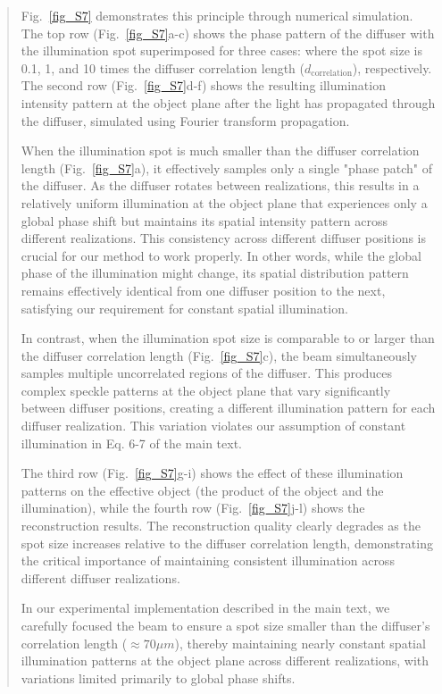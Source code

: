 \documentclass[12pt]{article}
\newenvironment{ourresponse}
    {\begin{tcolorbox}[width=\linewidth,breakable,enhanced,colback=gray!5,colframe=responsecolor!50,title=Response,left=5pt,right=5pt]}
    {\end{tcolorbox}}
\begin{document}
\begin{ourresponse}
\begin{quote}
        Fig.~\ref{fig_S7} demonstrates this principle through numerical simulation. The top row (Fig.~\ref{fig_S7}a-c) shows the phase pattern of the diffuser with the illumination spot superimposed for three cases: where the spot size is 0.1, 1, and 10 times the diffuser correlation length ($d_{\text{correlation}}$), respectively. The second row (Fig.~\ref{fig_S7}d-f) shows the resulting illumination intensity pattern at the object plane after the light has propagated through the diffuser, simulated using Fourier transform propagation.
        
        When the illumination spot is much smaller than the diffuser correlation length (Fig.~\ref{fig_S7}a), it effectively samples only a single "phase patch" of the diffuser. As the diffuser rotates between realizations, this results in a relatively uniform illumination at the object plane that experiences only a global phase shift but maintains its spatial intensity pattern across different realizations. This consistency across different diffuser positions is crucial for our method to work properly. In other words, while the global phase of the illumination might change, its spatial distribution pattern remains effectively identical from one diffuser position to the next, satisfying our requirement for constant spatial illumination.
        
        In contrast, when the illumination spot size is comparable to or larger than the diffuser correlation length (Fig.~\ref{fig_S7}c), the beam simultaneously samples multiple uncorrelated regions of the diffuser. This produces complex speckle patterns at the object plane that vary significantly between diffuser positions, creating a different illumination pattern for each diffuser realization. This variation violates our assumption of constant illumination in Eq. 6-7 of the main text.
        
        The third row (Fig.~\ref{fig_S7}g-i) shows the effect of these illumination patterns on the effective object (the product of the object and the illumination), while the fourth row (Fig.~\ref{fig_S7}j-l) shows the reconstruction results. The reconstruction quality clearly degrades as the spot size increases relative to the diffuser correlation length, demonstrating the critical importance of maintaining consistent illumination across different diffuser realizations.
        
        In our experimental implementation described in the main text, we carefully focused the beam to ensure a spot size smaller than the diffuser's correlation length ($\approx 70 \mu m$), thereby maintaining nearly constant spatial illumination patterns at the object plane across different realizations, with variations limited primarily to global phase shifts.
        \end{quote}
        
        \end{ourresponse}
        
\end{document}
